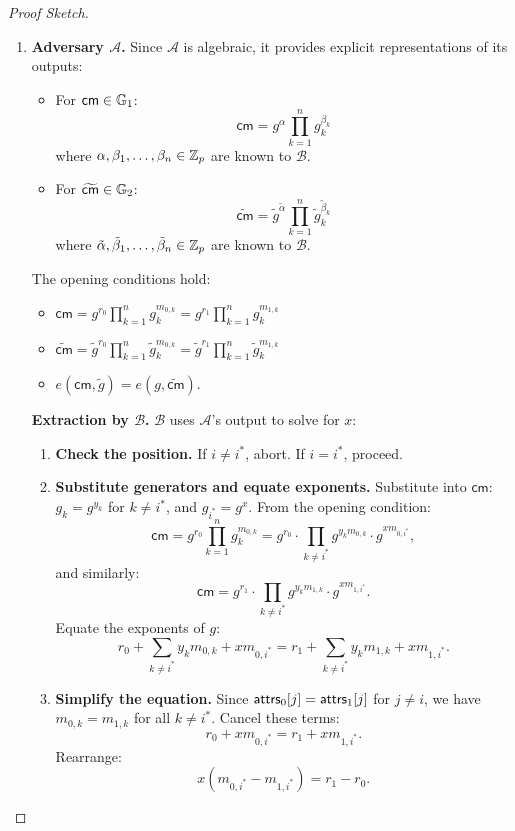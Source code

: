 \begin{proof}[Proof Sketch]
\begin{enumerate}
    
      \item  \textbf{Adversary $\mathcal{A}$.} Since $\mathcal{A}$ is algebraic, it provides explicit representations of its outputs:
        \begin{itemize}
            \item For $\mathsf{cm} \in \mathbb{G}_1$: 
            $$\mathsf{cm} = g^{\alpha} \prod_{k=1}^n g_k^{\beta_k}$$
            where $\alpha, \beta_1, \ldots, \beta_n \in \mathbb{Z}_p$ are known to $\mathcal{B}$.
            \item For $\widetilde{\mathsf{cm}} \in \mathbb{G}_2$: 
            $$\widetilde{\mathsf{cm}} = \tilde{g}^{\tilde{\alpha}} \prod_{k=1}^n \tilde{g}_k^{\tilde{\beta}_k}$$
            where $\tilde{\alpha}, \tilde{\beta}_1, \ldots, \tilde{\beta}_n \in \mathbb{Z}_p$ are known to $\mathcal{B}$.
        \end{itemize}
        The opening conditions hold:
        \begin{itemize}
            \item $\mathsf{cm} = g^{r_0} \prod_{k=1}^n g_k^{m_{0,k}} = g^{r_1} \prod_{k=1}^n g_k^{m_{1,k}}$
            \item $\widetilde{\mathsf{cm}} = \tilde{g}^{r_0} \prod_{k=1}^n \tilde{g}_k^{m_{0,k}} = \tilde{g}^{r_1} \prod_{k=1}^n \tilde{g}_k^{m_{1,k}}$
            \item $e(\mathsf{cm}, \tilde{g}) = e(g, \widetilde{\mathsf{cm}})$.
        \end{itemize}


\textbf{Extraction by $\mathcal{B}$.} $\mathcal{B}$ uses $\mathcal{A}$'s output to solve for $x$:

\begin{enumerate}
        \item \textbf{Check the position.} If $i \neq i^*$, abort. If $i = i^*$, proceed.
        
        \item \textbf{Substitute generators and equate exponents.} Substitute into $\mathsf{cm}$: $g_k = g^{y_k}$ for $k \neq i^*$, and $g_{i^*} = g^x$. From the opening condition:
        $$\mathsf{cm} = g^{r_0} \prod_{k=1}^n g_k^{m_{0,k}} = g^{r_0} \cdot \prod_{k \neq i^*} g^{y_k m_{0,k}} \cdot g^{x m_{0,i^*}},$$
        and similarly:
        $$\mathsf{cm} = g^{r_1} \cdot \prod_{k \neq i^*} g^{y_k m_{1,k}} \cdot g^{x m_{1,i^*}}.$$
        Equate the exponents of $g$:
        $$r_0 + \sum_{k \neq i^*} y_k m_{0,k} + x m_{0,i^*} = r_1 + \sum_{k \neq i^*} y_k m_{1,k} + x m_{1,i^*}.$$
        
        \item \textbf{Simplify the equation.} Since $\mathsf{attrs}_0[j] = \mathsf{attrs}_1[j]$ for $j \neq i$, we have $m_{0,k} = m_{1,k}$ for all $k \neq i^*$. Cancel these terms:
        $$r_0 + x m_{0,i^*} = r_1 + x m_{1,i^*}.$$
        Rearrange:
        $$x (m_{0,i^*} - m_{1,i^*}) = r_1 - r_0.$$
        

\end{enumerate}
\end{enumerate}
\end{proof}
